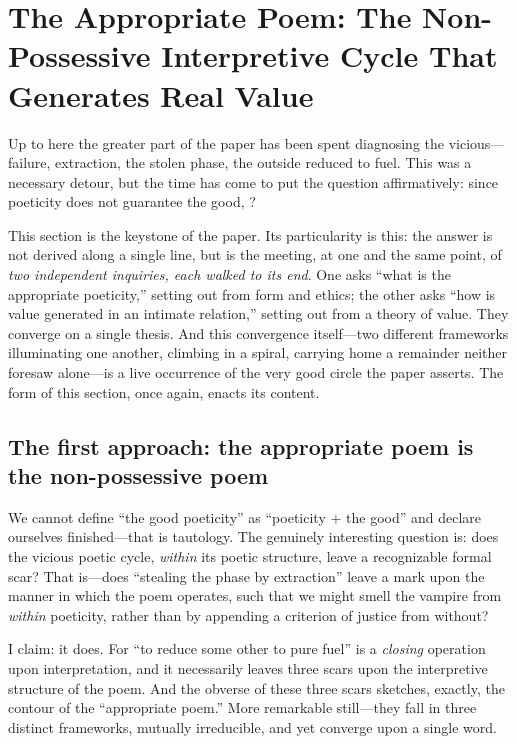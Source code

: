 \section{The Appropriate Poem: The Non-Possessive Interpretive Cycle That Generates Real Value}
\label{p09:sec:core}

\noindent
Up to here the greater part of the paper has been spent diagnosing the vicious---failure, extraction, the stolen phase, the outside reduced to fuel. This was a necessary detour, but the time has come to put the question affirmatively: since poeticity does not guarantee the good, ?

This section is the keystone of the paper. Its particularity is this: the answer is not derived along a single line, but is the meeting, at one and the same point, of \emph{two independent inquiries, each walked to its end}. One asks ``what is the appropriate poeticity,'' setting out from form and ethics; the other asks ``how is value generated in an intimate relation,'' setting out from a theory of value. They converge on a single thesis. And this convergence itself---two different frameworks illuminating one another, climbing in a spiral, carrying home a remainder neither foresaw alone---is a live occurrence of the very good circle the paper asserts. The form of this section, once again, enacts its content.

\subsection{The first approach: the appropriate poem is the non-possessive poem}
\label{p09:sec:non-possess}

We cannot define ``the good poeticity'' as ``poeticity $+$ the good'' and declare ourselves finished---that is tautology. The genuinely interesting question is: does the vicious poetic cycle, \emph{within} its poetic structure, leave a recognizable formal scar? That is---does ``stealing the phase by extraction'' leave a mark upon the manner in which the poem operates, such that we might smell the vampire from \emph{within} poeticity, rather than by appending a criterion of justice from without?

I claim: it does. For ``to reduce some other to pure fuel'' is a \emph{closing} operation upon interpretation, and it necessarily leaves three scars upon the interpretive structure of the poem. And the obverse of these three scars sketches, exactly, the contour of the ``appropriate poem.'' More remarkable still---they fall in three distinct frameworks, mutually irreducible, and yet converge upon a single word.

